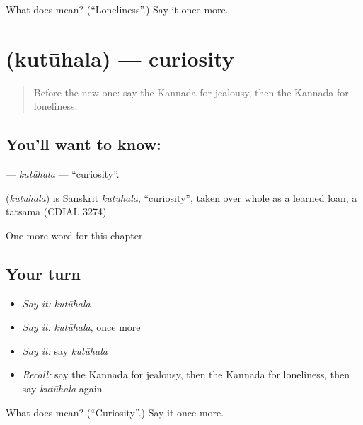 \begin{tcolorbox}[breakable,colback=teal!4,colframe=teal!35!black,title={Before you move on}]
What does  mean? (\textquotedblleft{}Loneliness\textquotedblright{}.) Say it once more.
\end{tcolorbox}
\section[\texorpdfstring{\kn{ಕುತೂಹಲ} (kutūhala)}{ಕುತೂಹಲ (kutūhala)}]{ (kutūhala) — curiosity}

\label{lesson:KA-C169-kutuhala}



\begin{quote}
Before the new one: say the Kannada for jealousy, then the Kannada for loneliness.
\end{quote}

\subsection*{You'll want to know: }
\textbf{} — \emph{kutūhala} — \textquotedblleft{}curiosity\textquotedblright{}.

\begin{cousinweb}
\textbf{} (\emph{kutūhala}) is Sanskrit \emph{kutūhala}, \textquotedblleft{}curiosity\textquotedblright{}, taken over whole as a learned loan, a tatsama (CDIAL 3274).
\end{cousinweb}

\begin{grammarlens}[title={What you've built}]
One more word for this chapter.
\end{grammarlens}

\subsection*{Your turn}
\begin{itemize}
\raggedright
  \item \emph{Say it:} \emph{kutūhala}
  \item \emph{Say it:} \emph{kutūhala}, once more
  \item \emph{Say it:} say \emph{kutūhala}
  \item \emph{Recall:} say the Kannada for jealousy, then the Kannada for loneliness, then say \emph{kutūhala} again
\end{itemize}

\begin{tcolorbox}[breakable,colback=teal!4,colframe=teal!35!black,title={Before you move on}]
What does  mean? (\textquotedblleft{}Curiosity\textquotedblright{}.) Say it once more.
\end{tcolorbox}
